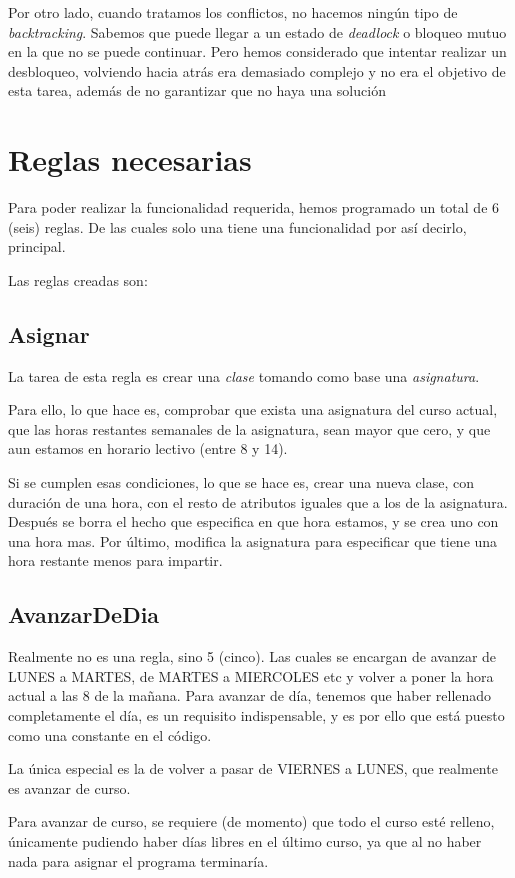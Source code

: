 \documentclass{report}
\begin{document}
Por otro lado, cuando tratamos los conflictos, no hacemos ning\'{u}n tipo de \emph{backtracking}. Sabemos que 
puede llegar a un estado de \emph{deadlock} o bloqueo mutuo en la que no se puede continuar. Pero hemos considerado
que intentar realizar un desbloqueo, volviendo hacia atr\'{a}s era demasiado complejo y no era el objetivo de esta
tarea, adem\'{a}s de no garantizar que no haya una soluci\'{o}n

\section{Reglas necesarias}
Para poder realizar la funcionalidad requerida, hemos programado un total de 6 (seis) reglas. De las cuales solo
una tiene una funcionalidad por as\'{i} decirlo, principal.

Las reglas creadas son:
\subsection{Asignar}
La tarea de esta regla es crear una \emph{clase} tomando como base una \emph{asignatura}.

Para ello, lo que hace es, comprobar que exista una asignatura del curso actual, que las horas restantes semanales
de la asignatura, sean mayor que cero, y que aun estamos en horario lectivo (entre 8 y 14).

Si se cumplen esas condiciones, lo que se hace es, crear una nueva clase, con duraci\'{o}n de una hora, con el resto de
atributos iguales que a los de la asignatura. Despu\'{e}s se borra el hecho que especifica en que hora estamos, y
se crea uno con una hora mas. Por \'{u}ltimo, modifica la asignatura para especificar que tiene una hora restante
menos para impartir.

\subsection{AvanzarDeDia}
Realmente no es una regla, sino 5 (cinco). Las cuales se encargan de avanzar de LUNES a MARTES, de MARTES a MIERCOLES
etc y volver a poner la hora actual a las 8 de la ma\~{n}ana. Para avanzar de d\'{i}a, tenemos que haber rellenado
completamente el d\'{i}a, es un requisito indispensable, y es por ello que est\'{a} puesto como una constante en
el c\'{o}digo.

La \'{u}nica especial es la de volver a pasar de VIERNES a LUNES, que realmente es avanzar de curso.

Para avanzar de curso, se requiere (de momento) que todo el curso est\'{e} relleno, \'{u}nicamente pudiendo haber
d\'{i}as libres en el \'{u}ltimo curso, ya que al no haber nada para asignar el programa terminar\'{i}a.

\end{document}
